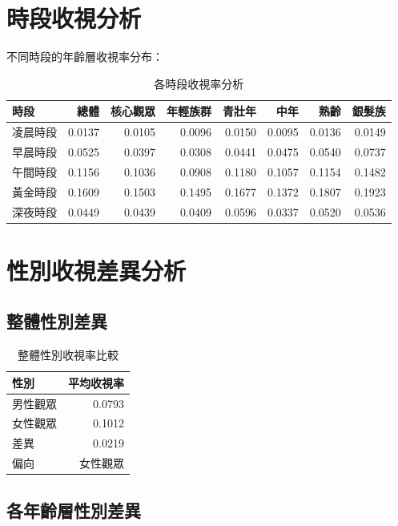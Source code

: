 \documentclass[12pt,a4paper]{article}
\begin{document}
\section{時段收視分析}

不同時段的年齡層收視率分布：

\begin{table}[H]
\centering
\caption{各時段收視率分析}
\begin{tabular}{lrrrrrrr}
\toprule
時段 & 總體 & 核心觀眾 & 年輕族群 & 青壯年 & 中年 & 熟齡 & 銀髮族 \\
\midrule
凌晨時段 & 0.0137 & 0.0105 & 0.0096 & 0.0150 & 0.0095 & 0.0136 & 0.0149 \\
早晨時段 & 0.0525 & 0.0397 & 0.0308 & 0.0441 & 0.0475 & 0.0540 & 0.0737 \\
午間時段 & 0.1156 & 0.1036 & 0.0908 & 0.1180 & 0.1057 & 0.1154 & 0.1482 \\
黃金時段 & 0.1609 & 0.1503 & 0.1495 & 0.1677 & 0.1372 & 0.1807 & 0.1923 \\
深夜時段 & 0.0449 & 0.0439 & 0.0409 & 0.0596 & 0.0337 & 0.0520 & 0.0536 \\

\bottomrule
\end{tabular}
\end{table}

\section{性別收視差異分析}

\subsection{整體性別差異}

\begin{table}[H]
\centering
\caption{整體性別收視率比較}
\begin{tabular}{lr}
\toprule
性別 & 平均收視率 \\
\midrule
男性觀眾 & 0.0793 \\
女性觀眾 & 0.1012 \\
差異 & 0.0219 \\
偏向 & 女性觀眾 \\
\bottomrule
\end{tabular}
\end{table}

\subsection{各年齡層性別差異}
\end{document}
